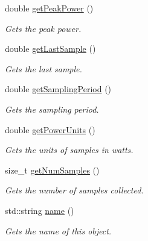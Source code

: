 \begin{DoxyCompactItemize}
double \hyperlink{classxmem_1_1power_1_1_power_reader_ae530d62676bd3b3115815b0f4592a0d6}{get\+Peak\+Power} ()
\begin{DoxyCompactList}\small\item\em Gets the peak power. \end{DoxyCompactList}\item 
double \hyperlink{classxmem_1_1power_1_1_power_reader_a0025b83ec146f206257690ef27323141}{get\+Last\+Sample} ()
\begin{DoxyCompactList}\small\item\em Gets the last sample. \end{DoxyCompactList}\item 
double \hyperlink{classxmem_1_1power_1_1_power_reader_a833084fa298a654a7cf589723483399c}{get\+Sampling\+Period} ()
\begin{DoxyCompactList}\small\item\em Gets the sampling period. \end{DoxyCompactList}\item 
double \hyperlink{classxmem_1_1power_1_1_power_reader_a951b1ddd8a39df60b2668548e7529064}{get\+Power\+Units} ()
\begin{DoxyCompactList}\small\item\em Gets the units of samples in watts. \end{DoxyCompactList}\item 
size\+\_\+t \hyperlink{classxmem_1_1power_1_1_power_reader_af35118b0e7d408679497f84aa0f6397e}{get\+Num\+Samples} ()
\begin{DoxyCompactList}\small\item\em Gets the number of samples collected. \end{DoxyCompactList}\item 
std\+::string \hyperlink{classxmem_1_1power_1_1_power_reader_ac0f465b044512502eb1824f18d60e3e6}{name} ()
\begin{DoxyCompactList}\small\item\em Gets the name of this object. \end{DoxyCompactList}\end{DoxyCompactItemize}
